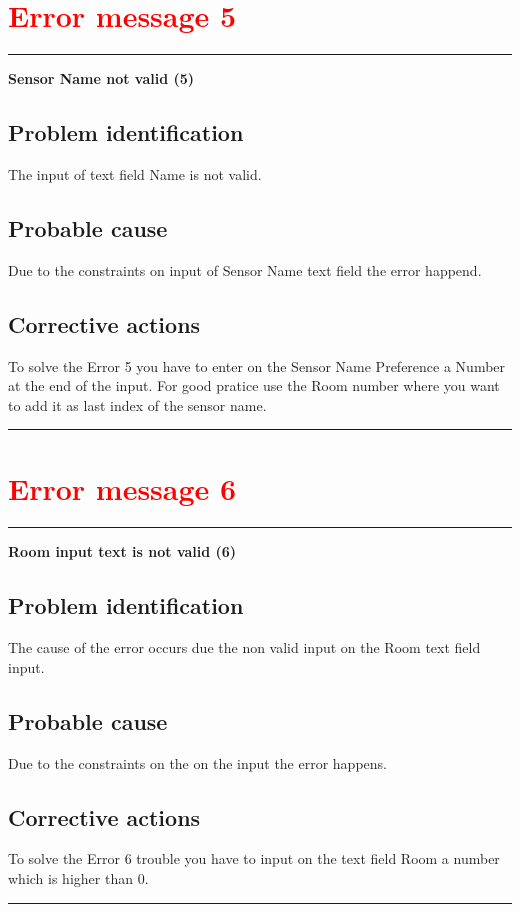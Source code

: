 \section{\textbf{\textcolor{red}{Error message 5}}}
\hrule
\vspace{0.5cm}
\textbf{Sensor Name not valid (5)}
\subsection{Problem identification}
The input of text field Name is not valid.

\subsection{Probable cause}
Due to the constraints on  input of Sensor Name text field the error happend.

\subsection{Corrective actions}
To solve the Error 5 you have to enter on the Sensor Name Preference a Number at
the end of the input. For good pratice use the Room number where you want to add
it as last index of the sensor name.
\vspace{0.5cm}
\hrule
\break

\section{\textbf{\textcolor{red}{Error message 6}}}
\hrule
\vspace{0.5cm}
\textbf{Room input text is not valid (6)}
\subsection{Problem identification}
The cause of the error occurs due the non valid input on the Room text field
input.

\subsection{Probable cause}
Due to the constraints on the on the input the error happens.

\subsection{Corrective actions}
To solve the Error 6 trouble you have to input on the text field Room a number
which is higher than 0.
\vspace{0.5cm}
\hrule
\hfill
